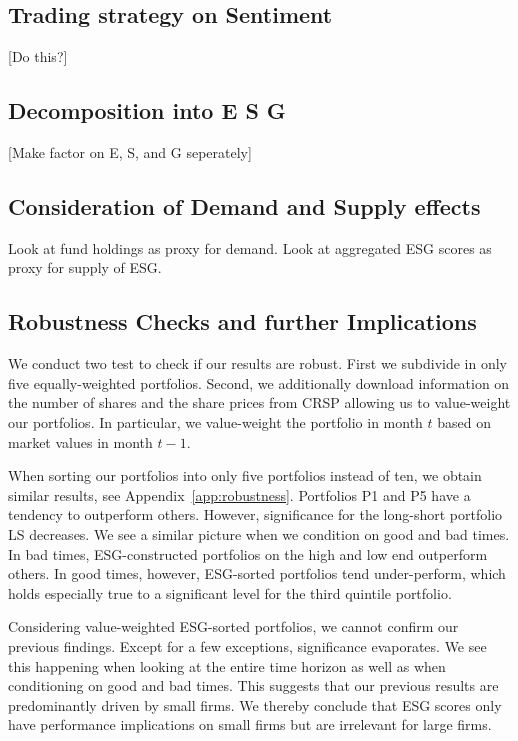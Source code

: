 \documentclass[11pt]{article}
\begin{document}
\subsection{Trading strategy on Sentiment}
[Do this?]

\subsection{Decomposition into E S G}
[Make factor on E, S, and G seperately]

\subsection{Consideration of Demand and Supply effects}
Look at fund holdings as proxy for demand.
Look at aggregated ESG scores as proxy for supply of ESG.

\subsection{Robustness Checks and further Implications}

We conduct two test to check if our results are robust. First we subdivide in only five equally-weighted portfolios. Second, we additionally download information on the number of shares and the share prices from CRSP allowing us to value-weight our portfolios. In particular, we value-weight the portfolio in month $t$ based on market values in month $t-1$. 

When sorting our portfolios into only five portfolios instead of ten, we obtain similar results, see Appendix~\ref{app:robustness}. Portfolios P1 and P5 have a tendency to outperform others. However, significance for the long-short portfolio LS decreases. We see a similar picture when we condition on good and bad times. In bad times, ESG-constructed portfolios on the high and low end outperform others. In good times, however, ESG-sorted portfolios tend under-perform, which holds especially true to a significant level for the third quintile portfolio. 

Considering value-weighted ESG-sorted portfolios, we cannot confirm our previous findings. Except for a few exceptions, significance evaporates. We see this happening when looking at the entire time horizon as well as when conditioning on good and bad times. This suggests that our previous results are predominantly driven by small firms. We thereby conclude that ESG scores only have performance implications on small firms but are irrelevant for large firms.
\end{document}
